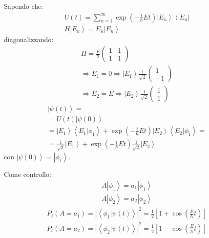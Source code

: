 Sapendo che:
\begin{equation}\begin{split}
U\left(t\right)=\sum_{n=1}^{\infty }{\exp{\left(-\frac{i}{\hbar }Et\right)}\left |E_n \right\rangle\left\langle E_n\right |}\\
H\left |E_n \right\rangle=E_n\left |E_n \right\rangle
\end{split}\end{equation}
diagonalizzando:
\begin{equation}\begin{split}
H=\frac{E}{2}\left(\begin{matrix}1&1\\1&1\end{matrix}\right)\\
\Longrightarrow E_1=0 \Longrightarrow \left |E_1 \right\rangle\frac{1}{\sqrt{2}}\left(\begin{matrix}1\\-1\end{matrix}\right)\\
\Longrightarrow E_2=E \Longrightarrow \left |E_2 \right\rangle\frac{1}{\sqrt{2}}\left(\begin{matrix}1\\1\end{matrix}\right)
\end{split}\end{equation}
\begin{equation}\begin{split}
\left |\psi \left(t\right) \right\rangle=\\
=U\left(t\right)\left |\psi \left(0\right) \right\rangle=\\
=\left |E_1 \right\rangle\left\langle E_1|\phi_1 \right\rangle+\exp{\left(-\frac{i}{\hbar }Et\right)}\left |E_2 \right\rangle\left\langle E_2|\phi_1 \right\rangle=\\
=\frac{1}{\sqrt{2}}\left |E_1 \right\rangle+\exp{\left(-\frac{i}{\hbar }Et\right)}\frac{1}{\sqrt{2}}\left |E_2 \right\rangle
\end{split}\end{equation}
con $\left |\psi \left(0\right) \right\rangle=\left |\phi_1 \right\rangle$.

Come controllo:
\begin{equation}\begin{split}
A\left |\phi_1 \right\rangle=a_1\left |\phi_1 \right\rangle\\
A\left |\phi_2 \right\rangle=a_2\left |\phi_2 \right\rangle
\end{split}\end{equation}
\begin{equation}\begin{split}
P_t\left(A=a_1\right)=\left|\left\langle \phi_1|\psi \left(t\right) \right\rangle\right|^2=\frac{1}{2}\left[1+\cos{\left(\frac{E}{\hbar }t\right)}\right]\\
P_t\left(A=a_2\right)=\left|\left\langle \phi_2|\psi \left(t\right) \right\rangle\right|^2=\frac{1}{2}\left[1-\cos{\left(\frac{E}{\hbar }t\right)}\right]
\end{split}\end{equation}

